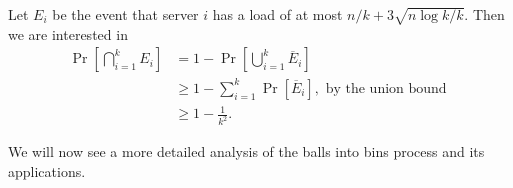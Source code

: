 Let $E_i$ be the event that server $i$ has a load of at most $n/k + 3\sqrt{n\log k/k}$. Then we are interested in 
\begin{align*}
	\Pr\left[ \bigcap_{i=1}^k E_i \right] &= 1 - \Pr\left[ \bigcup_{i=1}^k \overline{E}_i \right]\\
	& \geq 1 - \sum_{i=1}^k \Pr[\overline{E}_i], \text{ by the union bound }\\
	& \geq 1 - \frac{1}{k^2}.
\end{align*}

We will now see a more detailed analysis of the balls into bins process and its applications.

